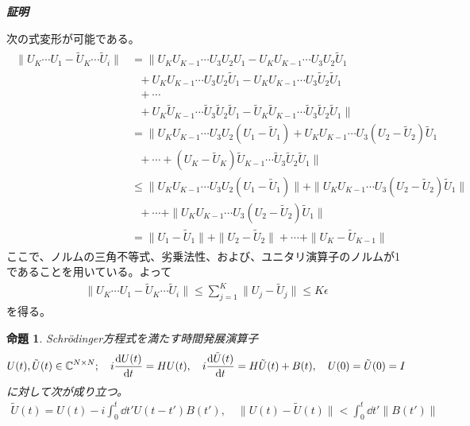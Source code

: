 \documentclass[dvipdfmx]{jarticle}
\makeatletter
\numberwithin{equation}{section}
\renewenvironment{proof}[1][\proofname]{\par
  \pushQED{\qed}
  \normalfont \topsep6\p@\@plus6\p@\relax
  \trivlist
  \item\relax
  {\itshape
  #1\@addpunct{ }}\hspace\labelsep\ignorespaces
}{
  \popQED\endtrivlist\@endpefalse
}
\theoremstyle{seminar}
\newtheorem{proposition}{命題}[section]
\renewcommand{\proofname}{\textbf{証明}}
\makeatother
\begin{document}
\begin{proof}
  次の式変形が可能である。
  \begin{align}
    \begin{split}
      \|U_K \cdots U_1 - \tilde{U}_K \cdots \tilde{U}_i\|
      &= \| U_K U_{K-1} \cdots U_3U_2U_1 - U_KU_{K-1} \cdots U_3U_2\tilde{U}_1 \\
      &\,\,\,\,+ U_K U_{K-1} \cdots U_3U_2\tilde{U}_1 - U_KU_{K-1} \cdots U_3\tilde{U}_2\tilde{U}_1 \\
      &\,\,\,\,+ \cdots \\
      &\,\,\,\,+ U_K \tilde{U}_{K-1} \cdots \tilde{U}_3 \tilde{U}_2 \tilde{U}_1 - \tilde{U}_K \tilde{U}_{K-1} \cdots \tilde{U}_3 \tilde{U}_2 \tilde{U}_1 \| \\
      &= \| U_K U_{K-1} \cdots U_3 U_2 (U_1 - \tilde{U}_1) + U_K U_{K-1} \cdots U_3 (U_2 - \tilde{U}_2) \tilde{U}_1 \\ &\,\,\,\,+  \cdots + (U_K - \tilde{U}_{K})\tilde{U}_{K-1} \cdots \tilde{U}_3 \tilde{U}_2 \tilde{U}_1 \| \\
      &\leq \| U_K U_{K-1} \cdots U_3 U_2 (U_1 - \tilde{U}_1) \| + \| U_K U_{K-1} \cdots U_3 (U_2 - \tilde{U}_2) \tilde{U}_1 \| \\
      &\,\,\,\,+ \cdots + \| U_K U_{K-1} \cdots U_3 (U_2 - \tilde{U}_2) \tilde{U}_1 \| \\
      &= \| U_1 - \tilde{U}_1 \| + \| U_2 - \tilde{U}_2 \| + \cdots + \| U_K - \tilde{U}_{K-1} \| 
    \end{split}
  \end{align}
  ここで、ノルムの三角不等式、劣乗法性、および、ユニタリ演算子のノルムが1であることを用いている。よって
  \begin{align}
    \|U_K \cdots U_1 - \tilde{U}_K \cdots \tilde{U}_i\| \leq \sum_{j = 1}^{K} \| U_j - \tilde{U}_j \| \leq K\epsilon
  \end{align}
  を得る。
\end{proof}

\begin{proposition}
  Schrödinger方程式を満たす時間発展演算子
  \begin{align}
    U(t), \tilde{U}(t) \in \mathbb{C}^{N \times N}; \quad i\dv{U(t)}{t} = HU(t), \quad i\dv{\tilde{U}(t)}{t} = H\tilde{U}(t) + B(t), \quad U(0) = \tilde{U}(0) = I
  \end{align}
  に対して次が成り立つ。
  \begin{align}
    \tilde{U}(t) = U(t) - i \int_0^t \dd t' U(t - t')B(t'), \quad \| U(t) - \tilde{U}(t) \| < \int_0^t \dd t' \| B(t')\| \label{solution}
  \end{align}
\end{proposition}
\end{document}
